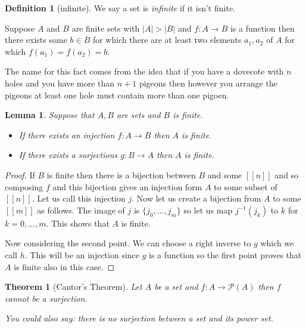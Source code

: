 \documentclass[
]{book}
\newtheorem{theorem}{Theorem}[chapter]
\newtheorem{lemma}{Lemma}[chapter]
\theoremstyle{definition}
\newtheorem{definition}{Definition}[chapter]
\theoremstyle{definition}
\theoremstyle{definition}
\theoremstyle{definition}
\theoremstyle{remark}
\begin{document}
\begin{definition}[infinite]
We say a set is \emph{infinite} if it isn't finite.
\end{definition}

Suppose \(A\) and \(B\) are finite sets with \(|A| > |B|\) and \(f: A \rightarrow B\) is a function then there exists some \(b \in B\) for which there are at least two elements \(a_1,a_2\) of \(A\) for which \(f(a_1)=f(a_2)=b\).

The name for this fact comes from the idea that if you have a dovecote with \(n\) holes and you have more than \(n+1\) pigeons then however you arrange the pigeons at least one hole must contain more than one pigoen.

\begin{lemma}

Suppose that \(A,B\) are sets and \(B\) is finite.

\begin{itemize}
\item
  If there exists an injection \(f: A \rightarrow B\) then \(A\) is finite.
\item
  If there exists a surjections \(g: B \rightarrow A\) then \(A\) is finite.
\end{itemize}

\end{lemma}

\begin{proof}
If \(B\) is finite then there is a bijection between \(B\) and some \([[n]]\) and so composing \(f\) and this bijection gives an injection form \(A\) to some subset of \([[n]]\). Let us call this injection \(j\). Now let us create a bijection from \(A\) to some \([[m]]\) as follows. The image of \(j\) is \(\{j_0, \dots, j_m\}\) so let us map \(j^{-1}(j_k)\) to \(k\) for \(k=0,\dots, m\). This shows that \(A\) is finite.

Now considering the second point. We can choose a right inverse to \(g\) which we call \(h\). This will be an injection since \(g\) is a function so the first point proves that \(A\) is finite also in this case.
\end{proof}

\begin{theorem}[Cantor's Theorem]
Let \(A\) be a set and \(f: A \rightarrow \mathcal{P}(A)\) then \(f\) cannot be a surjection.

You could also say: there is no surjection between a set and its power set.
\end{theorem}
\end{document}
